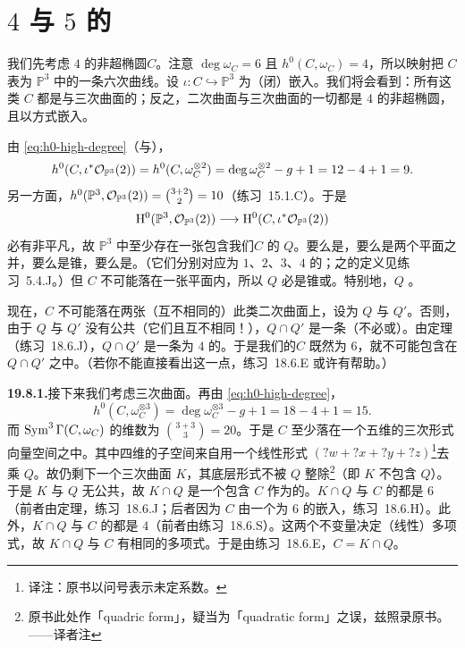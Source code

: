 
\section{\trGenus{} $4$ 与 $5$ 的\trCurve}

我们先考虑\trGenus{} $4$ 的非超椭圆\trCurve{}$C$。注意 $\deg\omega_C=6$ 且 $h^0(C,\omega_C)=4$，所以\trCanonical{}映射把 $C$ 表为 $\mathbb{P}^3$ 中的一条六次曲线。设 $\iota\colon C\hookrightarrow\mathbb{P}^3$ 为\trCanonical{}（闭）嵌入。我们将会看到：所有这类 $C$ 都是\trQuadricSurface{}与三次曲面的\trCompleteIntersection；反之，二次曲面与三次曲面的一切\trRegular{}\trCompleteIntersection{}都是\trGenus{} $4$ 的非超椭圆\trCurve，且以\trCanonical{}方式嵌入。

由 \eqref{eq:h0-high-degree}（\trRiemannRoch{}与\trSerreDuality），
\[
h^0(C,\iota^*\mathcal{O}_{\mathbb{P}^3}(2))=h^0(C,\omega_C^{\otimes 2})=\deg\omega_C^{\otimes 2}-g+1=12-4+1=9.
\]
另一方面，$h^0(\mathbb{P}^3,\mathcal{O}_{\mathbb{P}^3}(2))=\binom{3+2}{2}=10$（\mbox{练习~15.1.C}）。于是\trRestrictionMap
\[
\mathrm{H}^0(\mathbb{P}^3,\mathcal{O}_{\mathbb{P}^3}(2))\longrightarrow \mathrm{H}^0(C,\iota^*\mathcal{O}_{\mathbb{P}^3}(2))
\]
必有非平凡\trKernel，故 $\mathbb{P}^3$ 中至少存在一张包含我们\trCurve{}$C$ 的\trQuadricSurface{} $Q$。\trQuadricSurface{}要么是\trDoublePlane，要么是两个平面之并，要么是锥，要么是\trRegular{}\trQuadricSurface。（它们分别对应\trRank{}为 $1$、$2$、$3$、$4$ 的\trQuadraticForm{}；\trQuadraticForm{}之\trRank{}的定义见\mbox{练习~5.4.J}。）但 $C$ 不可能落在一张平面内，所以 $Q$ 必是锥或\trRegular{}\trQuadricSurface。特别地，$Q$ \trIrreducible。

现在，$C$ 不可能落在两张（互不相同的）此类二次曲面上，设为 $Q$ 与 $Q'$。否则，由于 $Q$ 与 $Q'$ 没有公共\trIrreducibleComponent（它们\trIrreducible{}且互不相同！），$Q\cap Q'$ 是一条\trCurve（不必\trReduced{}或\trIrreducible）。由\trBezout{}定理（\mbox{练习~18.6.J}），$Q\cap Q'$ 是一条\trDegree{}为 $4$ 的\trCurve。于是我们的\trCurve{}$C$ 既然\trDegree{}为 $6$，就不可能包含在 $Q\cap Q'$ 之中。（若你不能直接看出这一点，\mbox{练习~18.6.E} 或许有帮助。）

\textbf{19.8.1.}\quad 接下来我们考虑三次曲面。再由 \eqref{eq:h0-high-degree}，
\[
h^0(C,\omega_C^{\otimes 3})=\deg\omega_C^{\otimes 3}-g+1=18-4+1=15.
\]
而 $\operatorname{Sym}^3\Gamma(C,\omega_C)$ 的维数为 $\binom{3+3}{3}=20$。于是 $C$ 至少落在一个五维的三次形式向量空间之中。其中四维的子空间来自用一个线性形式 $(?w+?x+?y+?z)$\footnote{译注：原书以问号表示未定系数。}去乘\trQuadraticForm{} $Q$。故仍剩下一个三次曲面 $K$，其底层形式不被\trQuadraticForm{} $Q$ 整除\footnote{原书此处作「quadric form」，疑当为「quadratic form」之误，兹照录原书。——译者注}（即 $K$ 不包含 $Q$）。于是 $K$ 与 $Q$ 无公共\trIrreducibleComponent，故 $K\cap Q$ 是一个包含 $C$ 作为\trClosedSubscheme{}的\trCompleteIntersection。$K\cap Q$ 与 $C$ 的\trDegree{}都是 $6$（前者由\trBezout{}定理，\mbox{练习~18.6.J}；后者因为 $C$ 由一个\trDegree{}为 $6$ 的\trLineBundle{}嵌入，\mbox{练习~18.6.H}）。此外，$K\cap Q$ 与 $C$ 的\trArithmeticGenus{}都是 $4$（前者由\mbox{练习~18.6.S}）。这两个不变量决定（线性）\trHilbert{}多项式，故 $K\cap Q$ 与 $C$ 有相同的\trHilbert{}多项式。于是由\mbox{练习~18.6.E}，$C=K\cap Q$。

